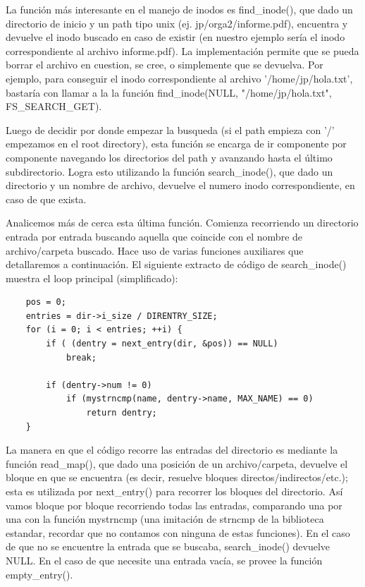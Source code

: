La función más interesante en el manejo de inodos es find\_inode(), que dado un
directorio de inicio y un path tipo unix (ej. jp/orga2/informe.pdf), encuentra y
devuelve el inodo buscado en caso de existir (en nuestro ejemplo sería el inodo
correspondiente al archivo informe.pdf). La implementación permite que se pueda
borrar el archivo en cuestion, se cree, o simplemente que se devuelva. Por
ejemplo, para conseguir el inodo correspondiente al archivo '/home/jp/hola.txt',
bastaría con llamar a la la función find\_inode(NULL, "/home/jp/hola.txt",
FS\_SEARCH\_GET).

Luego de decidir por donde empezar la busqueda (si el path empieza con '/'
empezamos en el root directory), esta función se encarga de ir componente por
componente navegando los directorios del path y avanzando hasta el último
subdirectorio. Logra esto utilizando la función search\_inode(), que dado un
directorio y un nombre de archivo, devuelve el numero inodo correspondiente, en
caso de que exista.

Analicemos más de cerca esta última función. Comienza recorriendo un
directorio entrada por entrada buscando aquella que coincide con el nombre de
archivo/carpeta buscado. Hace uso de varias funciones auxiliares que
detallaremos a continuación. El siguiente extracto de código de search\_inode()
muestra el loop principal (simplificado):

\begin{verbatim}
    pos = 0;
    entries = dir->i_size / DIRENTRY_SIZE;
    for (i = 0; i < entries; ++i) {
        if ( (dentry = next_entry(dir, &pos)) == NULL)
            break;

        if (dentry->num != 0)
            if (mystrncmp(name, dentry->name, MAX_NAME) == 0)
                return dentry;
    }
\end{verbatim}

La manera en que el código recorre las entradas del directorio es mediante la
función read\_map(), que dado una posición de un archivo/carpeta, devuelve el
bloque en que se encuentra (es decir, resuelve bloques
directos/indirectos/etc.); esta es utilizada por next\_entry() para recorrer
los bloques del directorio. Así vamos bloque por bloque recorriendo
todas las entradas, comparando una por una con la función
mystrncmp (una imitación de strncmp de la biblioteca estandar, recordar que no
contamos con ninguna de estas funciones). En el caso de que no se encuentre la
entrada que se buscaba, search\_inode() devuelve NULL. En el caso de que
necesite una entrada vacía, se provee la función empty\_entry().

